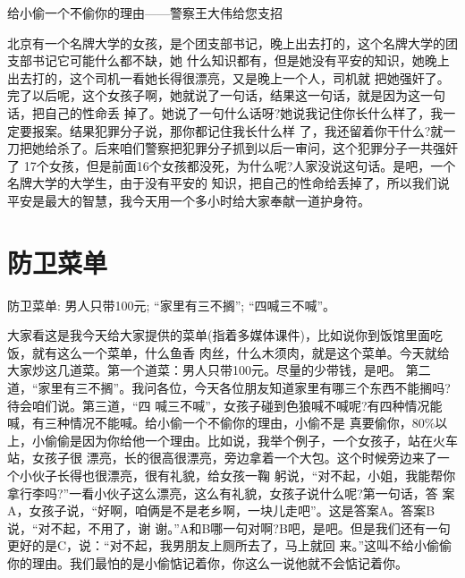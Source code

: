 \documentclass[11pt,a4paper,onecolumn]{article}
\begin{document}
\pagestyle{fancy}

\newcommand{\myrule}{\rule[3pt]{1.6em}{0.4mm}}

\begin{center}
\textsf{给小偷一个不偷你的理由——警察王大伟给您支招}
\end{center}

北京有一个名牌大学的女孩，是个团支部书记，晚上出去打的，这个名牌大学的团支部书记它可能什么都不缺，她
什么知识都有，但是她没有平安的知识，她晚上出去打的，这个司机一看她长得很漂亮，又是晚上一个人，司机就
把她强奸了。完了以后呢，这个女孩子啊，她就说了一句话，结果这一句话，就是因为这一句话，把自己的性命丢
掉了。她说了一句什么话呀?她说我记住你长什么样了，我一定要报案。结果犯罪分子说，那你都记住我长什么样
了，我还留着你干什么?就一刀把她给杀了。后来咱们警察把犯罪分子抓到以后一审问，这个犯罪分子一共强奸了
17个女孩，但是前面16个女孩都没死，为什么呢?人家没说这句话。是吧，一个名牌大学的大学生，由于没有平安的
知识，把自己的性命给丢掉了，所以我们说平安是最大的智慧，我今天用一个多小时给大家奉献一道护身符。

\section{防卫菜单}


防卫菜单: 男人只带100元; ``家里有三不搁''; ``四喊三不喊''。

大家看这是我今天给大家提供的菜单(指着多媒体课件)，比如说你到饭馆里面吃饭，就有这么一个菜单，什么鱼香
肉丝，什么木须肉，就是这个菜单。今天就给大家炒这几道菜。第一个道菜：男人只带100元。尽量的少带钱，是吧。
第二道，``家里有三不搁''。我问各位，今天各位朋友知道家里有哪三个东西不能搁吗?待会咱们说。第三道，``四
喊三不喊''，女孩子碰到色狼喊不喊呢?有四种情况能喊，有三种情况不能喊。给小偷一个不偷你的理由，小偷不是
真要偷你，80\%以上，小偷偷是因为你给他一个理由。比如说，我举个例子，一个女孩子，站在火车站，女孩子很
漂亮，长的很高很漂亮，旁边拿着一个大包。这个时候旁边来了一个小伙子长得也很漂亮，很有礼貌，给女孩一鞠
躬说，``对不起，小姐，我能帮你拿行李吗?''一看小伙子这么漂亮，这么有礼貌，女孩子说什么呢?第一句话，答
案A，女孩子说，``好啊，咱俩是不是老乡啊，一块儿走吧''。这是答案A。答案B说，``对不起，不用了，谢
谢。''A和B哪一句对啊?B吧，是吧。但是我们还有一句更好的是C，说：``对不起，我男朋友上厕所去了，马上就回
来。''这叫不给小偷偷你的理由。我们最怕的是小偷惦记着你，你这么一说他就不会惦记着你。
\end{document}
